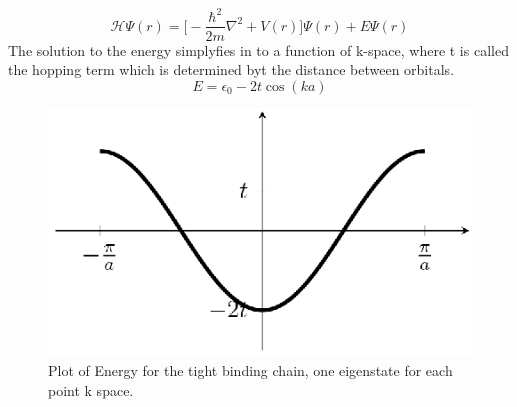 \documentclass[prl,onecolumn]{revtex4-1}  %
\begin{document}
\begin{equation}
\mathscr{H}\Psi(r) = \bigg [ -\frac{\hbar^2}{2m} \nabla^2 + V(r) \bigg ] \Psi(r) + E\Psi(r)
\end{equation} 
The solution to the energy simplyfies in to a function of k-space, where t is called the hopping term which is determined byt the distance between orbitals\cite{Simon}.
\begin{equation}
E = \epsilon_0 -2t\cos(ka)
\end{equation}
\begin{figure}[!h]
\centering
\includegraphics[width = .50\linewidth]{TightBindingChain.eps}
\caption{ Plot of Energy for the tight binding chain, one eigenstate for each point k space.}
\end{figure}
\end{document}
